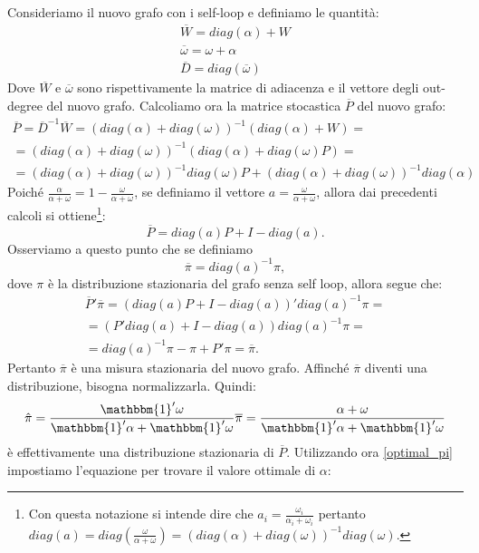 \begin{alphaparts}
    Consideriamo il nuovo grafo con i self-loop e definiamo le quantità:
    \begin{gather*}
        \overline{W}= diag(\alpha)+ W\\
        \overline{\omega}= \omega+ \alpha\\
        \overline{D}= diag(\overline{\omega})
    \end{gather*}
    Dove \(\overline{W}\) e \(\overline{\omega}\) sono rispettivamente la matrice di adiacenza e il vettore degli out-degree del nuovo grafo. Calcoliamo ora la matrice stocastica \(\overline{P}\) del nuovo grafo:
    \begin{gather*}
        \overline{P}= \overline{D}^{-1}\overline{W}=\left(diag(\alpha)+ diag(\omega)\right)^{-1}\left(diag(\alpha)+ W\right)=\\
        =\left(diag(\alpha)+ diag(\omega)\right)^{-1}\left(diag(\alpha)+ diag(\omega)P\right)=\\
        = \left(diag(\alpha)+ diag(\omega)\right)^{-1}diag(\omega)P + \left(diag(\alpha)+ diag(\omega)\right)^{-1}diag(\alpha)
    \end{gather*} 
    Poiché \(\frac{\alpha}{\alpha+ \omega}= 1- \frac{\omega}{\alpha+ \omega}\), se definiamo il vettore \(a= \frac{\omega}{\alpha+ \omega}\), allora dai precedenti calcoli si ottiene\footnote{Con questa notazione si intende dire che \(a_i = \frac{\omega_i}{\alpha_i + \omega_i}\) pertanto \(diag(a) = diag(\frac{\omega}{\alpha+ \omega}) = \left(diag(\alpha)+ diag(\omega)\right)^{-1}diag(\omega) \).}:
    \[\overline{P}= diag(a)P+ I- diag(a).\]
    Osserviamo a questo punto che se definiamo 
    \[\overline{\pi} = diag(a)^{-1}\pi,\]
    dove \(\pi\) è la distribuzione stazionaria del grafo senza self loop, allora segue che:
    \begin{gather*}
        \overline{P}'\overline{\pi}=\left(diag(a)P+ I- diag(a)\right)'diag(a)^{-1}\pi = \\
        = \left(P'diag(a)+ I- diag(a)\right)diag(a)^{-1}\pi= \\
        = diag(a)^{-1}\pi- \pi+ P'\pi = \overline{\pi}.
    \end{gather*}
    Pertanto \(\overline{\pi}\) è una misura stazionaria del nuovo grafo. Affinché \(\overline{\pi}\) diventi una distribuzione, bisogna normalizzarla. Quindi:
    \[\hat{\pi} = \frac{\mathbbm{1}'\omega}{\mathbbm{1}'\alpha+\mathbbm{1}'\omega}\overline{\pi} = \frac{\alpha+ \omega}{\mathbbm{1}'\alpha+\mathbbm{1}'\omega}\]
    è effettivamente una distribuzione stazionaria di \(\overline{P}\). Utilizzando ora \ref{optimal_pi} impostiamo l'equazione per trovare il valore ottimale di \(\alpha\):

\end{alphaparts}
